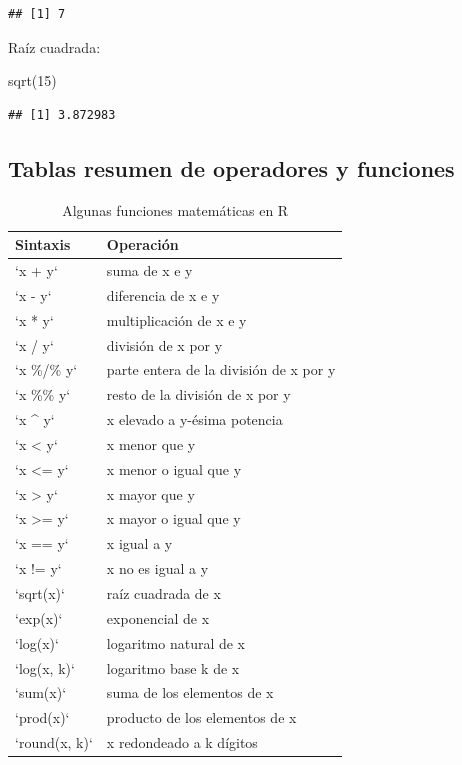 \documentclass[
]{book}
\newenvironment{Shaded}{\begin{snugshade}}{\end{snugshade}}
\newcommand{\DecValTok}[1]{\textcolor[rgb]{0.00,0.00,0.81}{#1}}
\newcommand{\FunctionTok}[1]{\textcolor[rgb]{0.00,0.00,0.00}{#1}}
\newcommand{\NormalTok}[1]{#1}
\begin{document}
\begin{verbatim}
## [1] 7
\end{verbatim}

Raíz cuadrada:

\begin{Shaded}
\begin{Highlighting}[]
\FunctionTok{sqrt}\NormalTok{(}\DecValTok{15}\NormalTok{)}
\end{Highlighting}
\end{Shaded}

\begin{verbatim}
## [1] 3.872983
\end{verbatim}

\hypertarget{tablas_resumen}{%
\subsection{Tablas resumen de operadores y funciones}\label{tablas_resumen}}

\begin{longtable}[t]{ll}
\caption{\label{tab:funcbasic}Algunas funciones matemáticas en R}\\
\toprule
Sintaxis & Operación\\
\midrule
`x + y` & suma de x e y\\
`x - y` & diferencia de x e y\\
`x * y` & multiplicación de x e y\\
`x / y` & división de x por y\\
`x \%/\% y` & parte entera de la división de x por y\\
\addlinespace
`x \%\% y` & resto de la división de x por y\\
`x \textasciicircum{} y` & x elevado a y-ésima potencia\\
`x < y` & x menor que y\\
`x <= y` & x menor o igual que y\\
`x > y` & x mayor que y\\
\addlinespace
`x >= y` & x mayor o igual que y\\
`x == y` & x igual a y\\
`x != y` & x no es igual a y\\
`sqrt(x)` & raíz cuadrada de x\\
`exp(x)` & exponencial de x\\
\addlinespace
`log(x)` & logaritmo natural de x\\
`log(x, k)` & logaritmo base k de x\\
`sum(x)` & suma de los elementos de x\\
`prod(x)` & producto de los elementos de x\\
`round(x, k)` & x redondeado a k dígitos\\
\bottomrule
\end{longtable}
\end{document}
